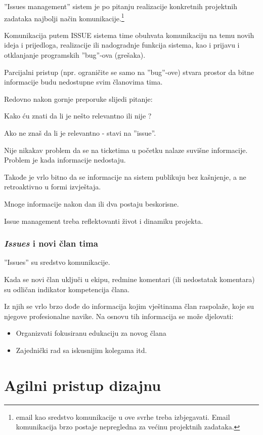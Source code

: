 \documentclass[lmodern, utf8, zavrsni]{fit}
\begin{document}
''Issues management'' sistem je po pitanju realizacije konkretnih projektnih zadataka najbolji način komunikacije.\footnote{email kao sredstvo komunikacije u ove svrhe treba izbjegavati. Email komunikacija brzo postaje nepregledna za većinu projektnih zadataka.}

Komunikacija putem ISSUE sistema time obuhvata komunikaciju na temu novih ideja i prijedloga, realizacije ili nadogradnje funkcija sistema, kao i prijavu i otklanjanje programskih ''bug''-ova (grešaka).

Parcijalni pristup (npr. ograničite se samo na ''bug''-ove) stvara prostor da bitne informacije budu nedostupne svim članovima tima.

Redovno nakon gornje preporuke slijedi pitanje:

Kako ću znati da li je nešto relevantno  ili nije ?

Ako ne znaš da li je relevantno - stavi na ''issue''. 

Nije nikakav problem da se na ticketima u početku nalaze suvišne informacije. Problem je kada informacije nedostaju.

Takođe je vrlo bitno da se informacije na sistem publikuju bez kašnjenje, a ne retroaktivno u formi izvještaja.

Mnoge informacije nakon dan ili dva postaju beskorisne.

Issue management treba reflektovanti život i dinamiku projekta.

\subsection{\emph{Issues} i novi član tima}

''Issues'' su sredstvo komunikacije.

Kada se novi član uključi u ekipu, redmine komentari (ili nedostatak komentara) su odličan indikator kompetencija člana.

Iz njih se vrlo brzo dođe do informacija kojim vještinama član raspolaže, koje su njegove profesionalne navike. Na osnovu tih informacija se može djelovati: 
\begin{itemize}
  \item Organizvati fokusiranu edukaciju za novog člana
  \item Zajednički rad sa iskusnijim kolegama itd.
\end{itemize}

\chapter{Agilni pristup dizajnu}
\end{document}

